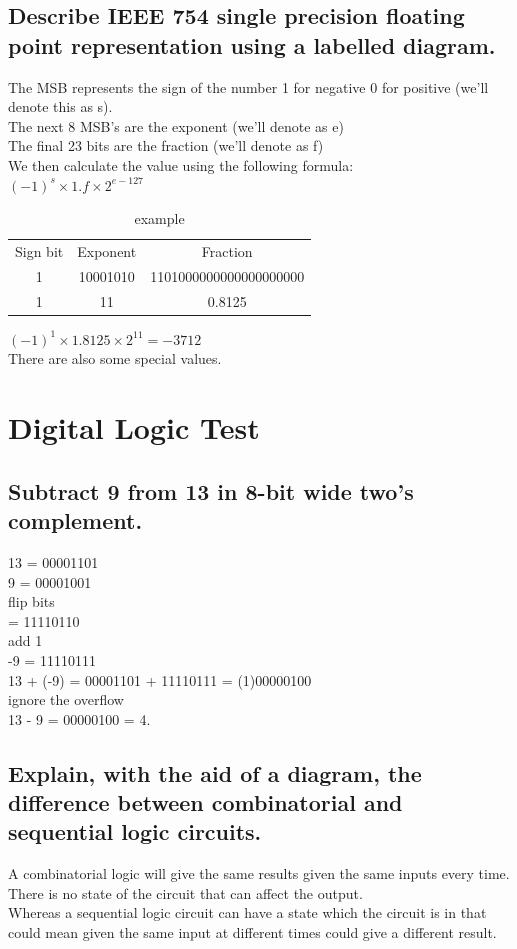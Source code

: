 \documentclass{article}
\begin{document}
\subsection{Describe IEEE 754 single precision floating point representation using a labelled diagram.}
The MSB represents the sign of the number 1 for negative 0 for positive (we'll denote this as s).\\
The next 8 MSB's are the exponent (we'll denote as e)\\
The final 23 bits are the fraction (we'll denote as f)\\
We then calculate the value using the following formula:\\
$(-1)^s \times 1.f \times 2^{e - 127}$\\
\begin{table}[h]
    \centering
    \begin{tabular}{|c|c|c|}
        Sign bit & Exponent & Fraction \\
        1 & 10001010 & 1101000000000000000000\\
        \hline
        1 & 11 & 0.8125
    \end{tabular}
    \caption{example}
    \label{tab:my_label}
\end{table}

$(-1)^1 \times 1.8125 \times 2^{11} = -3712$\\
There are also some special values.
\newpage
\section{Digital Logic Test}
\subsection{Subtract 9 from 13 in 8-bit wide two’s complement.}
13 = 00001101\\
9 = 00001001\\
flip bits\\
  = 11110110\\
add 1\\
-9 = 11110111\\
13 + (-9) = 00001101 + 11110111 = (1)00000100\\
ignore the overflow\\
13 - 9 = 00000100 = 4.

\subsection{Explain, with the aid of a diagram, the difference between combinatorial and sequential logic circuits.}
A combinatorial logic will give the same results given the same inputs every time. There is no state of the circuit that can affect the output.\\
Whereas a sequential logic circuit can have a state which the circuit is in that could mean given the same input at different times could give a different result.\\
\end{document}
